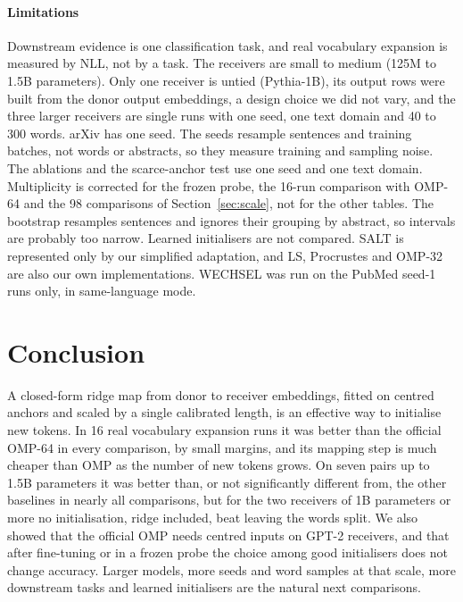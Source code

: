 \documentclass[preprint,12pt]{elsarticle}
\begin{document}
\paragraph{Limitations} Downstream evidence is one classification task, and real vocabulary expansion is measured by NLL, not by a task. The receivers are small to medium (125M to 1.5B parameters). Only one receiver is untied (Pythia-1B), its output rows were built from the donor output embeddings, a design choice we did not vary, and the three larger receivers are single runs with one seed, one text domain and 40 to 300 words. arXiv has one seed. The seeds resample sentences and training batches, not words or abstracts, so they measure training and sampling noise. The ablations and the scarce-anchor test use one seed and one text domain. Multiplicity is corrected for the frozen probe, the 16-run comparison with OMP-64 and the 98 comparisons of Section~\ref{sec:scale}, not for the other tables. The bootstrap resamples sentences and ignores their grouping by abstract, so intervals are probably too narrow. Learned initialisers \cite{minixhofer2024zett,dobler2025tokendistillation,li2025tokalign} are not compared. SALT \cite{lee2025salt} is represented only by our simplified adaptation, and LS, Procrustes and OMP-32 are also our own implementations. WECHSEL was run on the PubMed seed-1 runs only, in same-language mode.

\section{Conclusion}
\label{sec:conclusion}
A closed-form ridge map from donor to receiver embeddings, fitted on centred anchors and scaled by a single calibrated length, is an effective way to initialise new tokens. In 16 real vocabulary expansion runs it was better than the official OMP-64 in every comparison, by small margins, and its mapping step is much cheaper than OMP as the number of new tokens grows. On seven pairs up to 1.5B parameters it was better than, or not significantly different from, the other baselines in nearly all comparisons, but for the two receivers of 1B parameters or more no initialisation, ridge included, beat leaving the words split. We also showed that the official OMP needs centred inputs on GPT-2 receivers, and that after fine-tuning or in a frozen probe the choice among good initialisers does not change accuracy. Larger models, more seeds and word samples at that scale, more downstream tasks and learned initialisers are the natural next comparisons.
\end{document}
